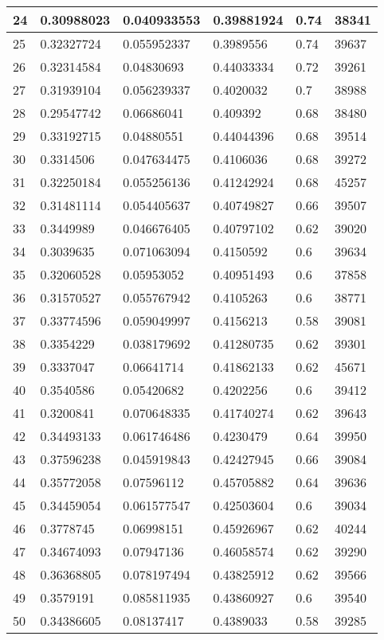 \begin{longtable}{|l|l|l|l|l|l|}
24 & 0.30988023 & 0.040933553 & 0.39881924 & 0.74 & 38341 \\ \hline 
25 & 0.32327724 & 0.055952337 & 0.3989556 & 0.74 & 39637 \\ \hline 
26 & 0.32314584 & 0.04830693 & 0.44033334 & 0.72 & 39261 \\ \hline 
27 & 0.31939104 & 0.056239337 & 0.4020032 & 0.7 & 38988 \\ \hline 
28 & 0.29547742 & 0.06686041 & 0.409392 & 0.68 & 38480 \\ \hline 
29 & 0.33192715 & 0.04880551 & 0.44044396 & 0.68 & 39514 \\ \hline 
30 & 0.3314506 & 0.047634475 & 0.4106036 & 0.68 & 39272 \\ \hline 
31 & 0.32250184 & 0.055256136 & 0.41242924 & 0.68 & 45257 \\ \hline 
32 & 0.31481114 & 0.054405637 & 0.40749827 & 0.66 & 39507 \\ \hline 
33 & 0.3449989 & 0.046676405 & 0.40797102 & 0.62 & 39020 \\ \hline 
34 & 0.3039635 & 0.071063094 & 0.4150592 & 0.6 & 39634 \\ \hline 
35 & 0.32060528 & 0.05953052 & 0.40951493 & 0.6 & 37858 \\ \hline 
36 & 0.31570527 & 0.055767942 & 0.4105263 & 0.6 & 38771 \\ \hline 
37 & 0.33774596 & 0.059049997 & 0.4156213 & 0.58 & 39081 \\ \hline 
38 & 0.3354229 & 0.038179692 & 0.41280735 & 0.62 & 39301 \\ \hline 
39 & 0.3337047 & 0.06641714 & 0.41862133 & 0.62 & 45671 \\ \hline 
40 & 0.3540586 & 0.05420682 & 0.4202256 & 0.6 & 39412 \\ \hline 
41 & 0.3200841 & 0.070648335 & 0.41740274 & 0.62 & 39643 \\ \hline 
42 & 0.34493133 & 0.061746486 & 0.4230479 & 0.64 & 39950 \\ \hline 
43 & 0.37596238 & 0.045919843 & 0.42427945 & 0.66 & 39084 \\ \hline 
44 & 0.35772058 & 0.07596112 & 0.45705882 & 0.64 & 39636 \\ \hline 
45 & 0.34459054 & 0.061577547 & 0.42503604 & 0.6 & 39034 \\ \hline 
46 & 0.3778745 & 0.06998151 & 0.45926967 & 0.62 & 40244 \\ \hline 
47 & 0.34674093 & 0.07947136 & 0.46058574 & 0.62 & 39290 \\ \hline 
48 & 0.36368805 & 0.078197494 & 0.43825912 & 0.62 & 39566 \\ \hline 
49 & 0.3579191 & 0.085811935 & 0.43860927 & 0.6 & 39540 \\ \hline 
50 & 0.34386605 & 0.08137417 & 0.4389033 & 0.58 & 39285 \\ \hline 
\end{longtable}